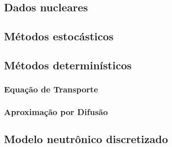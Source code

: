 
\subsection{Dados nucleares}
\label{subsec:dn}

\subsection{Métodos estocásticos}
\label{subsec:mc}

\subsection{Métodos determinísticos}
\label{subsec:det}

\subsubsection{Equação de Transporte}
\label{ssubsec:transp}

\subsubsection{Aproximação por Difusão}
\label{ssubsec:difusao}

\subsection{Modelo neutrônico discretizado}
\label{subsec:modelon}
